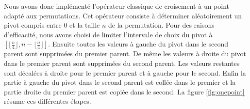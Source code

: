 \documentclass[french]{rapport}
\begin{document}
Nous avons donc implémenté l'opérateur classique de croisement à un point adapté aux permutations.
Cet opérateur consiste à déterminer aléatoirement un pivot compris entre 0 et la taille $n$ de la
permutation. Pour des raisons d'efficacité, nous avons choisi de limiter l'intervale de choix du
pivot à $\left[ \lfloor \frac{n}{4} \rfloor, n - \lfloor \frac{n}{4} \rfloor \right]$. Ensuite
toutes les valeurs à gauche du pivot dans le second parent sont supprimées du premier parent. De même
les valeurs à droite du pivot dans le premier parent sont supprimées du second parent. Les valeurs
restantes sont décalées à droite pour le premier parent et à gauche pour le second. Enfin la partie
à gauche du pivot dans le second parent est collée dans le premier et la partie droite du premier
parent est copiée dans le second. La figure \ref{fig:onepoint} résume ces différentes étapes.
\end{document}
